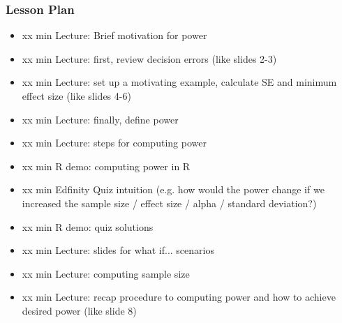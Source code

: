\begin{frame}
    \frametitle{Lesson Plan}
    \begin{itemize}
        \item xx min Lecture: Brief motivation for power
        \item xx min Lecture: first, review decision errors (like slides 2-3)
        \item xx min Lecture: set up a motivating example, calculate SE and minimum effect size (like slides 4-6)
        \item xx min Lecture: finally, define power
        \item xx min Lecture: steps for computing power
        \item xx min R demo: computing power in R
        \item xx min Edfinity Quiz intuition (e.g. how would the power change if we increased the sample size / effect size / alpha / standard deviation?)
        \item xx min R demo: quiz solutions
        \item xx min Lecture: slides for what if... scenarios
        \item xx min Lecture: computing sample size
        \item xx min Lecture: recap procedure to computing power and how to achieve desired power (like slide 8)
    \end{itemize}
\end{frame}

